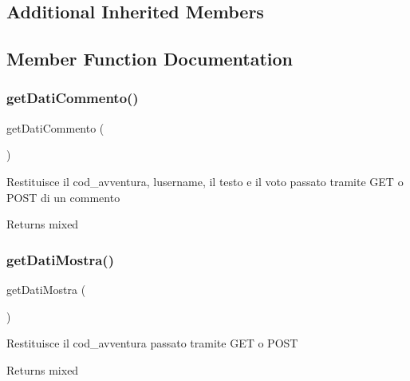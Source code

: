 \subsection*{Additional Inherited Members}


\subsection{Member Function Documentation}
\mbox{\label{class_v_ricerca_abe042c7ec0bf0e26f8b6d97855ffe723}} 
\subsubsection{\texorpdfstring{get\+Dati\+Commento()}{getDatiCommento()}}
{\footnotesize\ttfamily get\+Dati\+Commento (\begin{DoxyParamCaption}{ }\end{DoxyParamCaption})}

Restituisce il cod\+\_\+avventura, l\textquotesingle{}username, il testo e il voto passato tramite G\+ET o P\+O\+ST di un commento

\begin{DoxyReturn}{Returns}
mixed 
\end{DoxyReturn}
\mbox{\label{class_v_ricerca_a21c1b6e37828f68cadec73d5fe012eef}} 
\subsubsection{\texorpdfstring{get\+Dati\+Mostra()}{getDatiMostra()}}
{\footnotesize\ttfamily get\+Dati\+Mostra (\begin{DoxyParamCaption}{ }\end{DoxyParamCaption})}

Restituisce il cod\+\_\+avventura passato tramite G\+ET o P\+O\+ST

\begin{DoxyReturn}{Returns}
mixed 
\end{DoxyReturn}
\mbox{\label{class_v_ricerca_a0867be22250ee77c1059627deb1333ef}} 
